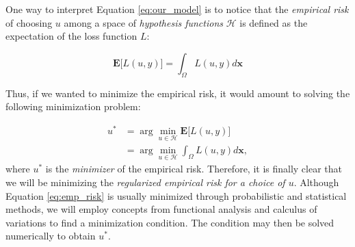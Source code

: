 \documentclass{INGUADY}
\begin{document}
\begin{body}
One way to interpret Equation \ref{eq:our_model} is to notice that the \textit{empirical risk} of choosing $u$ among a space of \textit{hypothesis functions} $\mathcal{H}$ is defined as the expectation of the loss function $L$:

\begin{equation*}
\mathbf{E} \big[  L(u, y)  \big] = \int_\Omega L(u, y) d\mathbf{x}
\end{equation*}

Thus, if we wanted to minimize the empirical risk, it would amount to solving the following minimization problem:

\begin{align} \label{eq:emp_risk}
u^* &= \arg\min_{u \in \mathcal{H}} \mathbf{E} \big[  L(u, y)  \big]  \\
&= \arg\min_{u \in \mathcal{H}} \int_\Omega L(u, y) d\mathbf{x} ,
\end{align}
where $u^*$ is the \textit{minimizer} of the empirical risk.
Therefore, it is finally clear that we will be minimizing the \textit{regularized empirical risk for a choice of $u$}. Although Equation \ref{eq:emp_risk} is usually minimized through probabilistic and statistical methods, we will employ concepts from functional analysis and calculus of variations to find a minimization condition. The condition may then be solved numerically to obtain $u^*$.


\end{body}
\end{document}
